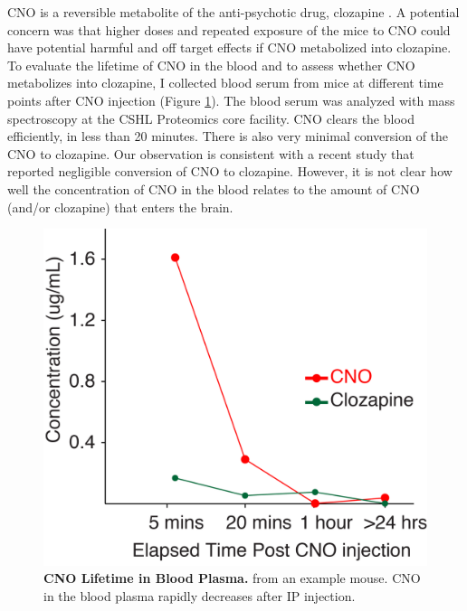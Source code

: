 CNO is a reversible metabolite of the anti-psychotic drug, clozapine \parencite{Lin1994,Chang1998}. A potential concern was that higher doses and repeated exposure of the mice to CNO could have potential harmful and off target effects if CNO metabolized into clozapine. To evaluate the lifetime of CNO in the blood and to assess whether CNO metabolizes into clozapine, I collected blood serum from mice at different time points after CNO injection (Figure \ref{fig:dreaddcnoblood}). The blood serum was analyzed with mass spectroscopy at the CSHL Proteomics core facility. CNO clears the blood efficiently, in less than 20 minutes. There is also very minimal conversion of the CNO to clozapine. Our observation is consistent with a recent study \parencite{Guettier2009} that reported negligible conversion of CNO to clozapine. However, it is not clear how well the concentration of CNO in the blood relates to the amount of CNO (and/or clozapine) that enters the brain. 
\begin{figure}
  \centering
  	\includegraphics[scale=0.5]{Figures/chapter3/cno_lifetime_in_the_blood.png}
  \caption[CNO Lifetime in Blood Plasma]{\textbf{CNO Lifetime in Blood Plasma.} from an example mouse. CNO in the blood plasma rapidly decreases after IP injection.}
   \label{fig:dreaddcnoblood}
\end{figure}
